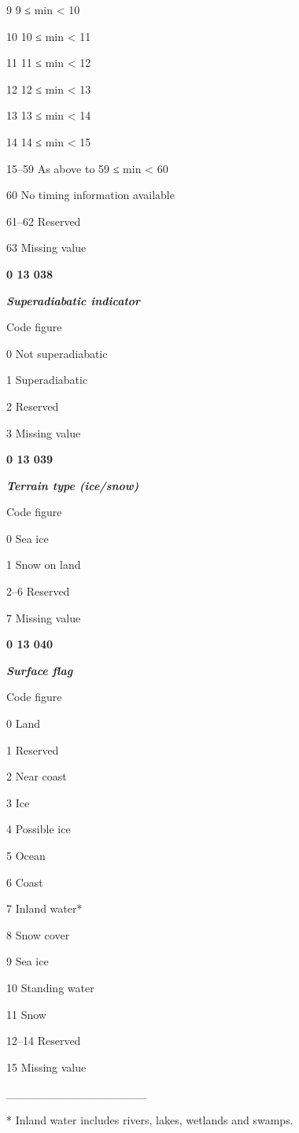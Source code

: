 9 9 ≤ min \textless{} 10

10 10 ≤ min \textless{} 11

11 11 ≤ min \textless{} 12

12 12 ≤ min \textless{} 13

13 13 ≤ min \textless{} 14

14 14 ≤ min \textless{} 15

15--59 As above to 59 ≤ min \textless{} 60

60 No timing information available

61--62 Reserved

63 Missing value

\textbf{0 13 038}

\emph{\textbf{Superadiabatic indicator}}

Code figure

0 Not superadiabatic

1 Superadiabatic

2 Reserved

3 Missing value

\textbf{0 13 039}

\emph{\textbf{Terrain type (ice/snow)}}

Code figure

0 Sea ice

1 Snow on land

2--6 Reserved

7 Missing value

\textbf{0 13 040}

\emph{\textbf{Surface flag}}

Code figure

0 Land

1 Reserved

2 Near coast

3 Ice

4 Possible ice

5 Ocean

6 Coast

7 Inland water*

8 Snow cover

9 Sea ice

10 Standing water

11 Snow

12--14 Reserved

15 Missing value

\_\_\_\_\_\_\_\_\_\_\_\_\_\_\_\_\_

* Inland water includes rivers, lakes, wetlands and swamps.

